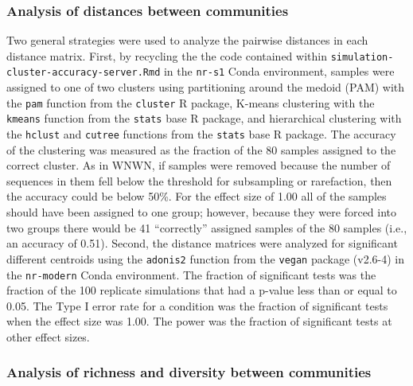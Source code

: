 \documentclass[
]{article}
\begin{document}
\hypertarget{analysis-of-distances-between-communities}{%
\subsubsection{Analysis of distances between
communities}\label{analysis-of-distances-between-communities}}

Two general strategies were used to analyze the pairwise distances in
each distance matrix. First, by recycling the the code contained within
\texttt{simulation-cluster-accuracy-server.Rmd} in the \texttt{nr-s1}
Conda environment, samples were assigned to one of two clusters using
partitioning around the medoid (PAM) with the \texttt{pam} function from
the \texttt{cluster} R package, K-means clustering with the
\texttt{kmeans} function from the \texttt{stats} base R package, and
hierarchical clustering with the \texttt{hclust} and \texttt{cutree}
functions from the \texttt{stats} base R package. The accuracy of the
clustering was measured as the fraction of the 80 samples assigned to
the correct cluster. As in WNWN, if samples were removed because the
number of sequences in them fell below the threshold for subsampling or
rarefaction, then the accuracy could be below 50\%. For the effect size
of 1.00 all of the samples should have been assigned to one group;
however, because they were forced into two groups there would be 41
``correctly'' assigned samples of the 80 samples (i.e., an accuracy of
0.51). Second, the distance matrices were analyzed for significant
different centroids using the \texttt{adonis2} function from the
\texttt{vegan} package (v2.6-4) in the \texttt{nr-modern} Conda
environment. The fraction of significant tests was the fraction of the
100 replicate simulations that had a p-value less than or equal to 0.05.
The Type I error rate for a condition was the fraction of significant
tests when the effect size was 1.00. The power was the fraction of
significant tests at other effect sizes.

\hypertarget{analysis-of-richness-and-diversity-between-communities}{%
\subsubsection{Analysis of richness and diversity between
communities}\label{analysis-of-richness-and-diversity-between-communities}}
\end{document}
